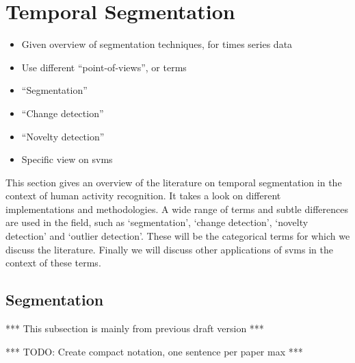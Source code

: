 \section{Temporal Segmentation}\label{sec:temporal_segmentation}

\begin{itemize}
  \item Given overview of segmentation techniques, for times series data
  \item Use different ``point-of-views'', or terms
  \item ``Segmentation''
  \item ``Change detection''
  \item ``Novelty detection''
  \item Specific view on \glspl{svm}
\end{itemize}

This section gives an overview of the literature on temporal segmentation in the context of human activity recognition.
It takes a look on different implementations and methodologies.
A wide range of terms and subtle differences are used in the field, such as `segmentation', `change detection', `novelty detection' and `outlier detection'.
These will be the categorical terms for which we discuss the literature.
Finally we will discuss other applications of \glspl{svm} in the context of these terms.

\subsection{Segmentation}\label{subsec:segmentation}
*** This subsection is mainly from previous draft version ***

*** TODO: Create compact notation, one sentence per paper max ***

